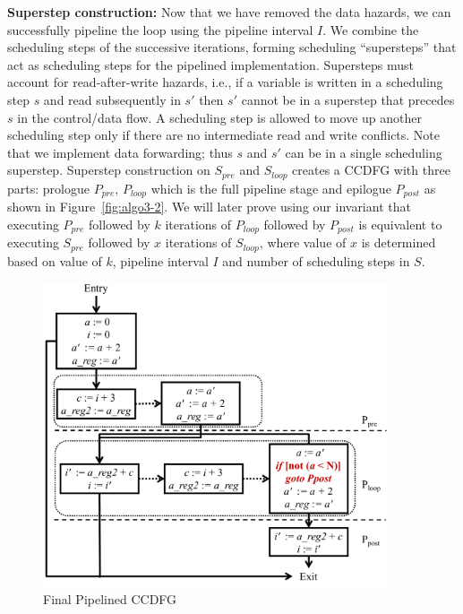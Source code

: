 {\bf Superstep construction:} Now that we have removed the data hazards, we can successfully pipeline the loop using  the pipeline interval $I$. We combine the scheduling steps of the successive iterations, forming scheduling ``supersteps'' that act as scheduling steps for the pipelined
implementation. Supersteps must account for read-after-write hazards, i.e., if a variable is written in a scheduling step $s$ and read subsequently in $s'$ then $s'$ cannot be in a superstep that precedes $s$ in the control/data flow. A scheduling step is allowed to move up another scheduling step only if there are no intermediate read and write conflicts. Note that we implement data forwarding; thus $s$ and $s'$ can be in a single scheduling superstep.
Superstep construction on $S_{pre}$ and $S_{loop}$ creates a CCDFG with three parts: prologue $P_{pre}$, $P_{loop}$ which is the full pipeline stage and epilogue $P_{post}$ as shown in Figure~\ref{fig:algo3-2}. We will later prove using our invariant that executing $P_{pre}$ followed by $k$ iterations of $P_{loop}$ followed by $P_{post}$ is equivalent to executing $S_{pre}$ followed by $x$ iterations of $S_{loop}$, where value of $x$ is determined based on value of $k$, pipeline interval $I$ and number of scheduling steps in $S$.

\begin{figure}[t!]
\begin{center}
\includegraphics[width=4in]{fig-proposal/algorithm-after-adding-branches}
\end{center}
\caption{Final Pipelined CCDFG}
\label{fig:algo4}
\end{figure}

